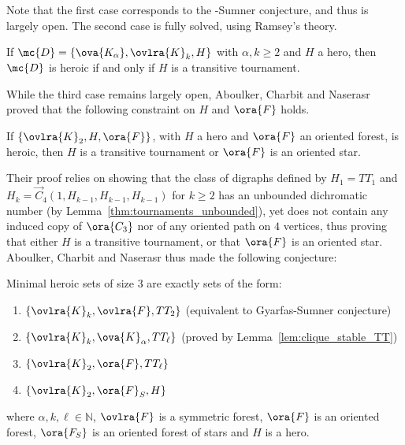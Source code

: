 \medskip

Note that the first case corresponds to the \Gya-Sumner conjecture, and thus is largely open. The second case is fully solved, using Ramsey's theory. %

\begin{lemma}\label{lem:clique_stable_TT}
If $\mc{D} = \{\ova{K_{\alpha}}, \ovlra{K}_k, H\}$ with $\alpha, k \geq 2$ and $H$ a hero, then $\mc{D}$ is heroic if and only if $H$ is a transitive tournament.
\end{lemma}


While the third case remains largely open, Aboulker, Charbit and Naserasr proved that the following constraint on $H$ and $\ora{F}$ holds.

\begin{lemma}
If $\{\ovlra{K}_2, H, \ora{F}\}$, with $H$ a hero and $\ora{F}$ an oriented forest, is heroic, then $H$ is a transitive tournament or $\ora{F}$ is an oriented star.
\end{lemma}

Their proof relies on showing that the class of digraphs defined by $H_1 = TT_1$ and $H_k = \vec C_{4}(1,H_{k-1},H_{k-1},H_{k-1})$ for $k \geq 2$ has an unbounded dichromatic number (by Lemma~\ref{thm:tournaments_unbounded}), yet does not contain any induced copy of $\ora{C_3}$ nor of any oriented path on $4$ vertices, thus proving that either $H$ is a transitive tournament, or that $\ora{F}$ is an oriented star. Aboulker, Charbit and Naserasr thus made the following conjecture:

\begin{conjecture}
Minimal heroic sets of size $3$ are exactly sets of the form:
\begin{enumerate}
    \item $\{\ovlra{K}_k, \ovlra{F}, TT_2\}$ (equivalent to Gyarfas-Sumner conjecture)
    \item $\{\ovlra{K}_k, \ova{K}_{\alpha}, TT_{\ell} \}$ (proved by Lemma~\ref{lem:clique_stable_TT})
    \item $\{\ovlra{K}_2, \ora{F}, TT_{\ell}\}$
    \item $\{\ovlra{K}_2, \ora{F}_S, H\}$
\end{enumerate}
where $\alpha, k, \ell \in \mathbb{N}$, $\ovlra{F}$ is a symmetric forest, $\ora{F}$ is an oriented forest, $\ora{F_S}$ is an oriented forest of stars and $H$ is a hero.
\end{conjecture}

